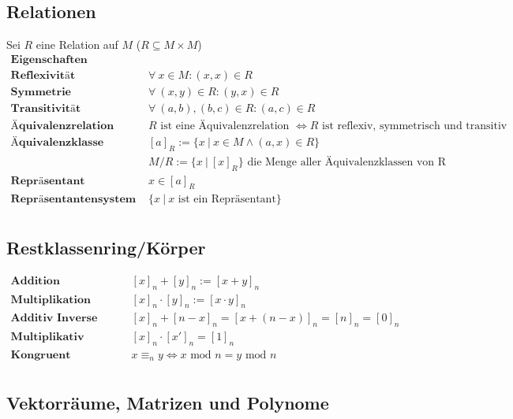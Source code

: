 \documentclass{article}
\begin{document}
		\subsection*{Relationen}
			Sei $R$ eine Relation auf $M$ ($R \subseteq M \times M$)\\
			\begin{align*}
				\textbf{Eigenschaften } & \\
				\textbf{Reflexivit\"at } & \forall\ x \in M: (x, x) \in R\\
				\textbf{Symmetrie } & \forall\ (x, y) \in R: (y, x) \in R\\
				\textbf{Transitivit\"at } & \forall\ (a, b), (b, c) \in R: (a, c) \in R\\\hline
				\textbf{\"Aquivalenzrelation } & R \text{ ist eine \"Aquivalenzrelation } \Leftrightarrow R \text{ ist reflexiv, symmetrisch und transitiv}\\
				\textbf{\"Aquivalenzklasse } & [a]_R := \{x\ |\ x \in M \wedge (a, x) \in R\}\\
				& M/R := \{x\ |\ [x]_R\} \text{ die Menge aller \"Aquivalenzklassen von R}\\
				\textbf{Repr\"asentant } & x \in [a]_R\\
				\textbf{Repr\"asentantensystem } & \{x\ |\ x \text{ ist ein Repr\"asentant}\}\\
			\end{align*}
		\subsection*{Restklassenring/K\"orper}
			\begin{align*}
				\textbf{Addition } & [x]_n + [y]_n := [x + y]_n\\
				\textbf{Multiplikation } & [x]_n \cdot [y]_n := [x \cdot y]_n\\
				\textbf{Additiv Inverse } & [x]_n + [n-x]_n = [x + (n - x)]_n = [n]_n = [0]_n\\
				\textbf{Multiplikativ Inverse } & [x]_n \cdot [x']_n = [1]_n\\
				\textbf{Kongruent } & x \equiv_n y \Leftrightarrow x \text{ mod } n = y \text{ mod } n\\
			\end{align*}
		\subsection*{Vektorr\"aume, Matrizen und Polynome}
\end{document}
